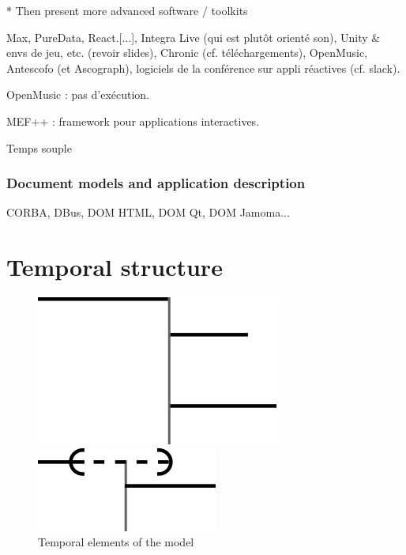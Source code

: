 \documentclass{sigchi}
\begin{document}
* Then present more advanced software / toolkits


Max, PureData, React.[...], Integra Live (qui est plutôt orienté son), Unity \& envs de jeu, etc. (revoir slides), Chronic (cf. téléchargements), OpenMusic, Antescofo (et Ascograph), logiciels de la conférence sur appli réactives (cf. slack).

OpenMusic : pas d'exécution.

MEF++\cite{ackermann_direct_1994} : framework pour applications interactives.

Temps souple\cite{song_interactive_1999}


\subsubsection{Document models and application description} %
CORBA, DBus, DOM HTML, DOM Qt, DOM Jamoma...


\section{Temporal structure}\label{sec.temporal}
\begin{figure}[h]
    \centering
    \begin{minipage}[b]{.5\linewidth}
        \centering
        \includegraphics[scale=0.6]{images/timenode.png}
    \end{minipage}\begin{minipage}[b]{.5\linewidth}
    \centering
    \includegraphics[scale=0.6]{images/souple.png}
\end{minipage}	

\caption{Temporal elements of the model}
\label{fig.cst.timenode}
\end{figure}	
\end{document}
